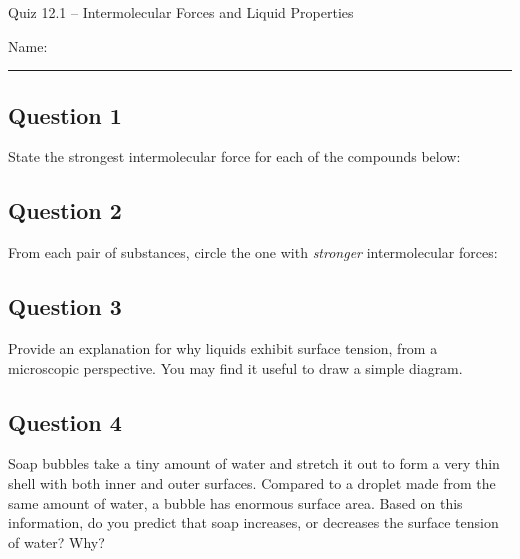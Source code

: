 \documentclass[11pt, letterpaper]{memoir}
\begin{document}
	\begin{center}
		{\large	Quiz 12.1 -- Intermolecular Forces and Liquid Properties}
	\end{center}
	{\large Name: \rule[-1mm]{4in}{.1pt} 
	\subsection*{Question 1}
	State the strongest intermolecular force for each of the compounds below:
	
	
	\vspace{3em}
	\subsection*{Question 2}
	From each pair of substances, circle the one with \emph{stronger} intermolecular forces:
	
	
	\vspace{1em}
	\subsection*{Question 3}
	Provide an explanation for why liquids exhibit surface tension, from a microscopic perspective. You may find it useful to draw a simple diagram.
	
	\vspace{6em}
	\subsection*{Question 4}
	Soap bubbles take a tiny amount of water and stretch it out to form a very thin shell with both inner and outer surfaces. Compared to a droplet made from the same amount of water, a bubble has enormous surface area. Based on this information, do you predict that soap increases, or decreases the surface tension of water? Why?
	
	\vspace{4em}
}
\end{document}
